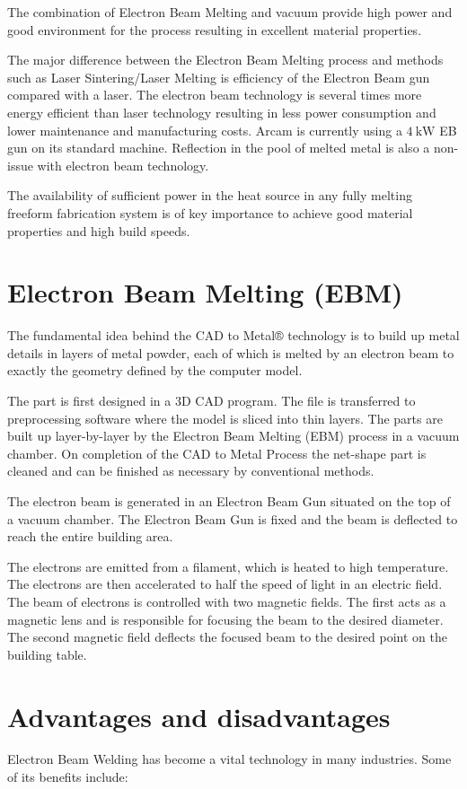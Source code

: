 \documentclass[10pt]{article}
\begin{document}
The combination of Electron Beam Melting and vacuum provide high power and good environment for the process resulting in excellent material properties.

The major difference between the Electron Beam Melting process and methods such as Laser Sintering/Laser Melting is efficiency of the Electron Beam gun compared with a laser. The electron beam technology is several times more energy efficient than laser technology resulting in less power consumption and lower maintenance and manufacturing costs. Arcam is currently using a $4 \mathrm{~kW}$ EB gun on its standard machine. Reflection in the pool of melted metal is also a non-issue with electron beam technology.

The availability of sufficient power in the heat source in any fully melting freeform fabrication system is of key importance to achieve good material properties and high build speeds.

\section*{Electron Beam Melting (EBM)}
The fundamental idea behind the CAD to Metal® technology is to build up metal details in layers of metal powder, each of which is melted by an electron beam to exactly the geometry defined by the computer model.

The part is first designed in a 3D CAD program. The file is transferred to preprocessing software where the model is sliced into thin layers. The parts are built up layer-by-layer by the Electron Beam Melting (EBM) process in a vacuum chamber. On completion of the CAD to Metal Process the net-shape part is cleaned and can be finished as necessary by conventional methods.

The electron beam is generated in an Electron Beam Gun situated on the top of a vacuum chamber. The Electron Beam Gun is fixed and the beam is deflected to reach the entire building area.

The electrons are emitted from a filament, which is heated to high temperature. The electrons are then accelerated to half the speed of light in an electric field. The beam of electrons is controlled with two magnetic fields. The first acts as a magnetic lens and is responsible for focusing the beam to the desired diameter. The second magnetic field deflects the focused beam to the desired point on the building table.

\section*{Advantages and disadvantages}
Electron Beam Welding has become a vital technology in many industries. Some of its benefits include:
\end{document}
